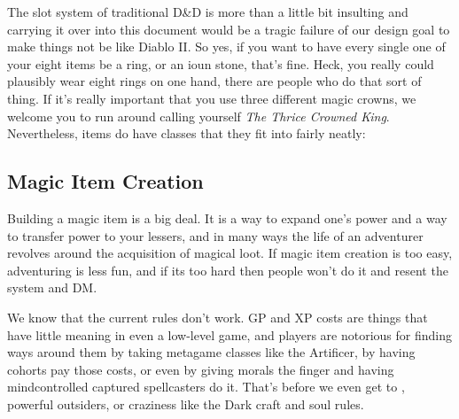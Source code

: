 The slot system of traditional D\&D is more than a little bit insulting and carrying it over into this document would be a tragic failure of our design goal to make things not be like Diablo II. So yes, if you want to have every single one of your eight items be a ring, or an ioun stone, that's fine. Heck, you really could plausibly wear eight rings on one hand, there are people who do that sort of thing. If it's really important that you use three different magic crowns, we welcome you to run around calling yourself \textit{The Thrice Crowned King}. Nevertheless, items do have classes that they fit into fairly neatly:

\begin{enumerate}
\end{enumerate}

\subsection{Magic Item Creation}

Building a magic item is a big deal. It is a way to expand one's power and a way to transfer power to your lessers, and in many ways the life of an adventurer revolves around the acquisition of magical loot. If magic item creation is too easy, adventuring is less fun, and if its too hard then people won't do it and resent the system and DM.

We know that the current rules don't work. GP and XP costs are things that have little meaning in even a low-level game, and players are notorious for finding ways around them by taking metagame classes like the Artificer, by having cohorts pay those costs, or even by giving morals the finger and having mindcontrolled captured spellcasters do it. That's before we even get to , powerful outsiders, or craziness like the Dark craft and soul rules.

